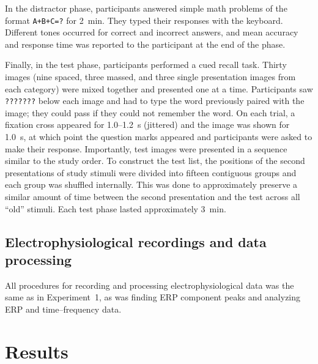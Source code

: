 In the distractor phase, participants answered simple math problems of the format \texttt{A+B+C=?} for 2~min.  They typed their responses with the keyboard.  Different tones occurred for correct and incorrect answers, and mean accuracy and response time was reported to the participant at the end of the phase.


Finally, in the test phase, participants performed a cued recall task.  Thirty images (nine spaced, three massed, and three single presentation images from each category) were mixed together and presented one at a time.  Participants saw \texttt{???????} below each image and had to type the word previously paired with the image; they could pass if they could not remember the word.  On each trial, a fixation cross appeared for 1.0--1.2~s (jittered) and the image was shown for 1.0~s, at which point the question marks appeared and participants were asked to make their response.  Importantly, test images were presented in a sequence similar to the study order.  To construct the test list, the positions of the second presentations of study stimuli were divided into fifteen contiguous groups and each group was shuffled internally.  This was done to approximately preserve a similar amount of time between the second presentation and the test across all ``old'' stimuli.  Each test phase lasted approximately 3~min.

\subsection{Electrophysiological recordings and data processing}

All procedures for recording and processing electrophysiological data was the same as in Experiment~1, as was finding ERP component peaks and analyzing ERP and time--frequency data.

\section{Results}


